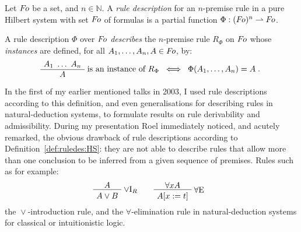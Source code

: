 \documentclass[envcountsame,runningheads]{llncs}
\newcommand{\nat}{\mathbb N}
\newcommand{\sfunin}{{:}}
\newcommand{\funin}{\mathrel{\sfunin}}
\newcommand{\sub}[2]{#1_{#2}}
\newcommand{\funap}[2]{#1(#2)}
\newcommand{\indap}[2]{{\sub{#1}{#2}}}
\newcommand{\forms}{{\mit F\hspace*{-1.1pt}o}}
\newcommand{\sdefdby}{{:}{=}}
\newcommand{\defdby}{\mathrel{\sdefdby}}
\newcommand{\saruledes}{\Phi}
\newcommand{\aruledes}{\funap{\Phi}}
\newcommand{\srule}{R}
\newcommand{\rulei}{\indap{\srule}}
\newcommand{\slogor}{{\vee}}
\newcommand{\logor}{\mathrel{\slogor}}
\begin{document}
\begin{definition}\normalfont
  \label{def:ruledes:HS}
Let $\forms$ be a set, and $n\in\nat$.
A \emph{rule description} for an $n$-premise rule
  in a pure Hilbert system with set $\forms$ of formulas is a partial function
  $\saruledes \funin (\forms)^n \rightharpoonup \forms$.
\begin{comment}
  \begin{equation*}
\saruledes \funin \underbrace{ \forms \times \ldots \times \forms }_{n}
      \: \rightharpoonup \: \forms \; ;
\end{equation*}
\end{comment}
A rule description $\saruledes$ over $\forms$ 
  \emph{describes} the $n$-premise rule $\rulei{\saruledes}$ on $\forms$
  whose \emph{instances} are defined, for all $A_1,\ldots,A_n,A\in\forms$, by:
\begin{align*}
\mbox{
       \AxiomC{$ A_1 $}
       \AxiomC{$ \ldots $}
       \AxiomC{$ A_n $}
       \insertBetweenHyps{\hspace*{-0.75ex}}
\TrinaryInfC{$ A $}
       \DisplayProof
          }
    \text{is an instance of $\rulei{\saruledes}$}
    \;\; & \Longleftrightarrow\;\;
\aruledes{A_1,\ldots,A_n} = A \; .
\end{align*}
\end{definition}


In the first of my earlier mentioned talks in 2003, 
I used rule descriptions according to this definition, 
and even generalisations for describing rules in
natural-deduction systems, to formulate results on rule derivability
and admissibility. During my presentation Roel immediately noticed, 
and acutely remarked, the obvious drawback of 
rule descriptions according to Definition~\ref{def:ruledes:HS}:
they are not able to describe rules that allow more than one conclusion 
to be inferred from a given sequence of premises. 
Rules such as for example:
\begin{align*}
&
  \mbox{ 
     \AxiomC{$ A $}
     \RightLabel{$\vee$I$_R$}
     \UnaryInfC{$ \rule{0pt}{2ex} A \vee B $}
     \DisplayProof
        }
  & &
  \mbox{
     \AxiomC{$ \forall x A $}
     \RightLabel{$\forall$E}
     \UnaryInfC{$ \rule{0pt}{2ex} A [x \defdby t] $}
     \DisplayProof
        }\end{align*}
the $\logor$-introduction rule, and the $\forall$-elimination rule
in natural-deduction systems for classical or intuitionistic logic.
\end{document}
